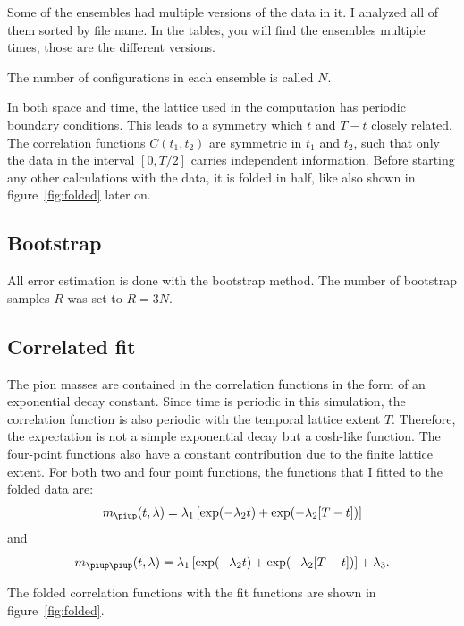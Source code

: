 \documentclass[11pt, english, fleqn, DIV=15, headinclude]{scrartcl}
\begin{document}
Some of the ensembles had multiple versions of the data in it. I analyzed all
of them sorted by file name. In the tables, you will find the ensembles
multiple times, those are the different versions.

The number of configurations in each ensemble is called $N$.

In both space and time, the lattice used in the computation has periodic
boundary conditions. This leads to a symmetry which $t$ and $T-t$ closely
related. The correlation functions $C(t_1, t_2)$ are symmetric in $t_1$ and
$t_2$, such that only the data in the interval $[0, T/2]$ carries independent
information. Before starting any other calculations with the data, it is folded
in half, like also shown in figure~\ref{fig:folded} later on.

\subsection{Bootstrap}
\label{sec:bootstrap}

All error estimation is done with the bootstrap method. The number of bootstrap
samples $R$ was set to $R = 3N$.

\subsection{Correlated fit}
\label{sec:correlated_fit}

The pion masses are contained in the correlation functions in the form of an
exponential decay constant. Since time is periodic in this simulation, the
correlation function is also periodic with the temporal lattice extent $T$.
Therefore, the expectation is not a simple exponential decay but a cosh-like
function. The four-point functions also have a constant contribution due to the
finite lattice extent. For both two and four point functions, the functions
that I fitted to the folded data are:
\begin{equation}
    \label{eq:fit2}
    m_\piup(t, \lambda) = \lambda_1 \sbr{\exp(-\lambda_2 t) + \exp(-\lambda_2
    [T - t])}
\end{equation}
and
\begin{equation}
    \label{eq:fit4}
    m_{\piup\piup}(t, \lambda) = \lambda_1 \sbr{\exp(-\lambda_2 t) + \exp(-\lambda_2
    [T - t])} + \lambda_3.
\end{equation}

The folded correlation functions with the fit functions are shown in
figure~\ref{fig:folded}.
\end{document}
